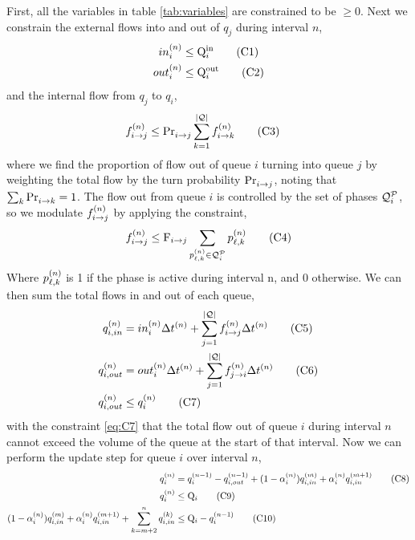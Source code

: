First, all the variables in table \ref{tab:variables} are constrained to be $\ge 0$.
Next we constrain the external flows into and out of $q_j$ during interval $n$,
\begin{align}
\inq{i} &\le \QIN{i} \tag{C1}\label{eq:C1}\\        
\outq{i} &\le \QOUT{i} \tag{C2}\label{eq:C2}
\end{align}
and the internal flow from $q_j$ to $q_i$,
\begin{align}
\f{i}{j} &\le \FTURN{i}{j} \sum \limits_{k=1}^{\Qn}  \f{i}{k} \tag{C3}\label{eq:C3}
\end{align}
where we find the proportion of flow out of queue $i$ turning into queue $j$ by weighting the total flow by the turn probability $\FTURN{i}{j}$, noting that $\sum_k \FTURN{i}{k}=1$. The flow out from queue $i$ is controlled by the set of phases $\QPset{i}$, so we modulate $\f{i}{j}$ by applying the constraint,
\begin{align}
\f{i}{j} \le \FMAX{i}{j} \sum \limits_{\p{\ell}{k} \in \QPset{i}} {\p{\ell}{k}} \tag{C4}\label{eq:C4}
\end{align}
Where $\p{\ell}{k}$ is 1 if the phase is active during interval n, and 0 otherwise. We can then sum the total flows in and out of each queue,
\begin{align}
\qin{i} &= \inq{i} \DT + \sum \limits_{j=1}^{\Qn}  \f{i}{j} \DT   \tag{C5}\label{eq:C5} \\
\qout{i} &= \outq{i} \DT + \sum \limits_{j=1}^{\Qn}  \f{j}{i} \DT \tag{C6}\label{eq:C6}\\
\qout{i} &\le \q{i} \tag{C7}\label{eq:C7}
\end{align}
with the constraint \ref{eq:C7} that the total flow out of queue $i$ during interval $n$ cannot exceed the volume of the queue at the start of that interval.
Now we can perform the update step for queue $i$ over interval $n$,
\begin{align}
\q{i} &= \q[n-1]{i} - \qout[n-1]{i} + (1-\aph{i})\qin[m]{i} + \aph{i} \qin[m+1]{i} \tag{C8}\label{eq:C8}\\
\q{i} &\le \QMAX{i} \tag{C9}\label{eq:C9}\\
(1-\aph{i})\qin[m]{i} + \aph{i} \qin[m+1]{i} + \sum \limits_{k=m+2}^n \qin[k]{i} &\le \QMAX{i} - \q[n-1]{i}\tag{C10}\label{eq:C10}
\end{align}
